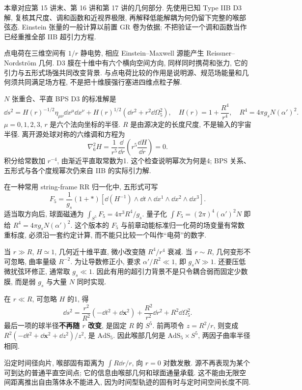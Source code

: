 本章对应第 15 讲末、第 16 讲和第 17 讲的几何部分. 先使用已知 Type IIB D3 解, 复核其尺度、调和函数和近视界极限, 再解释低能解耦为何仍留下完整的喉部弦态. Einstein 张量的一般计算以前置 GR 卷为依据; 不把验证一个调和函数当作已经重推全部 IIB 超引力方程.

点电荷在三维空间有 $1/r$ 静电势, 相应 Einstein--Maxwell 源能产生 Reissner--Nordström 几何. D3 膜在十维中有六个横向空间方向, 同样同时携荷和张力, 它的引力与五形式场强共同改变背景. 与点电荷比较的作用是说明源、规范场能量和几何须共同满足场方程, 不是把十维膜强行塞进四维点粒子解.

$N$ 张重合、平直 BPS D3 的标准解是
\[
\dd s^2=H(r)^{-1/2}\eta_{\mu\nu}\dd x^\mu\dd x^\nu
+H(r)^{1/2}(\dd r^2+r^2\dd\Omega_5^2),
\quad H(r)=1+\frac{R^4}{r^4},
\quad R^4=4\pi g_sN(\alpha')^2.
\]
$\mu=0,1,2,3$, $r$ 是六个法向坐标的半径. $R$ 是由源决定的长度尺度, 不是输入的宇宙半径. 离开源处球对称的六维调和方程为
\[
\nabla_6^2H=\frac1{r^5}\frac\dd{\dd r}
\left(r^5\frac{\dd H}{\dd r}\right)=0.
\]
积分给常数加 $r^{-4}$, 由渐近平直取常数为1. 这个检查说明幂次为何是4; BPS 关系、五形式与各个度规幂次仍来自 IIB 的实际引力解.

在一种常用 string-frame RR 归一化中, 五形式可写
\[
F_5=\frac1{g_s}(1+*)\left[\dd(H^{-1})\wedge
\dd t\wedge\dd x^1\wedge\dd x^2\wedge\dd x^3\right].
\]
适当取方向后, 球面磁通为 $\int_{S^5}F_5=4\pi^3R^4/g_s$. 量子化 $\int F_5=(2\pi)^4(\alpha')^2N$ 即给 $R^4=4\pi g_sN(\alpha')^2$. 这个版本的 $F_5$ 与前章动能标准归一化荷的场变量有常数重标度, 必须沿一套约定计算, 而不能只比较一个叫作“电荷”的数字.

当 $r\gg R$, $H\simeq1$, 几何近十维平直, 微小改变随 $R^4/r^4$ 衰减. 当 $r\sim R$, 几何变形不可忽略, 曲率量级 $R^{-2}$. 为让导数修正小, 要求 $\alpha'/R^2\ll1$, 即 $g_sN\gg1$. 还要压低微扰弦环修正, 通常取 $g_s\ll1$. 因此有用的超引力背景不是只令耦合弱而固定少数膜, 而是弱 $g_s$ 与大量 $N$ 同时实现.

在 $r\ll R$, 可忽略 $H$ 的1, 得
\[
\dd s^2=\frac{r^2}{R^2}(-\dd t^2+\dd\mathbf x^2)
+\frac{R^2}{r^2}\dd r^2+R^2\dd\Omega_5^2.
\]
最后一项的球半径\textbf{不再随 $r$ 改变}, 是固定 $R$ 的 $S^5$. 前两项令 $z=R^2/r$, 则变成 $R^2(-\dd t^2+\dd\mathbf x^2+\dd z^2)/z^2$, 是 $\mathrm{AdS}_5$. 因此喉部几何是 $\mathrm{AdS}_5\times S^5$, 两因子曲率半径相同.

沿定时间径向片, 喉部固有距离为 $\int R\dd r/r$, 向 $r=0$ 对数发散. 源不再表现为某个可到达的普通平直空间点; 它的信息由喉部几何和球面通量承载. 这不能由无限空间距离推出自由落体永不能进入, 因为时间型轨迹的固有时与定时间空间长度不同.

